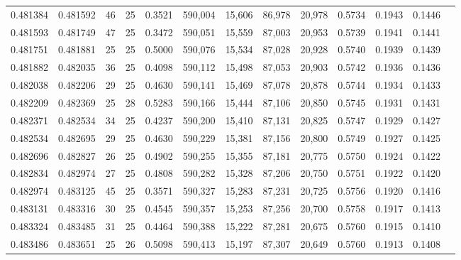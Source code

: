\begin{tabular}{rrrrrrrrrrrrr}
0.481384 & 0.481592 &    46 &  25 &                                     0.3521 & 590,004 &  15,606 &  86,978 &  20,978 & 0.5734 & 0.1943 & 0.1446 \\
0.481593 & 0.481749 &    47 &  25 &                                     0.3472 & 590,051 &  15,559 &  87,003 &  20,953 & 0.5739 & 0.1941 & 0.1441 \\
0.481751 & 0.481881 &    25 &  25 &                                     0.5000 & 590,076 &  15,534 &  87,028 &  20,928 & 0.5740 & 0.1939 & 0.1439 \\
0.481882 & 0.482035 &    36 &  25 &                                     0.4098 & 590,112 &  15,498 &  87,053 &  20,903 & 0.5742 & 0.1936 & 0.1436 \\
0.482038 & 0.482206 &    29 &  25 &                                     0.4630 & 590,141 &  15,469 &  87,078 &  20,878 & 0.5744 & 0.1934 & 0.1433 \\
0.482209 & 0.482369 &    25 &  28 &                                     0.5283 & 590,166 &  15,444 &  87,106 &  20,850 & 0.5745 & 0.1931 & 0.1431 \\
0.482371 & 0.482534 &    34 &  25 &                                     0.4237 & 590,200 &  15,410 &  87,131 &  20,825 & 0.5747 & 0.1929 & 0.1427 \\
0.482534 & 0.482695 &    29 &  25 &                                     0.4630 & 590,229 &  15,381 &  87,156 &  20,800 & 0.5749 & 0.1927 & 0.1425 \\
0.482696 & 0.482827 &    26 &  25 &                                     0.4902 & 590,255 &  15,355 &  87,181 &  20,775 & 0.5750 & 0.1924 & 0.1422 \\
0.482834 & 0.482974 &    27 &  25 &                                     0.4808 & 590,282 &  15,328 &  87,206 &  20,750 & 0.5751 & 0.1922 & 0.1420 \\
0.482974 & 0.483125 &    45 &  25 &                                     0.3571 & 590,327 &  15,283 &  87,231 &  20,725 & 0.5756 & 0.1920 & 0.1416 \\
0.483131 & 0.483316 &    30 &  25 &                                     0.4545 & 590,357 &  15,253 &  87,256 &  20,700 & 0.5758 & 0.1917 & 0.1413 \\
0.483324 & 0.483485 &    31 &  25 &                                     0.4464 & 590,388 &  15,222 &  87,281 &  20,675 & 0.5760 & 0.1915 & 0.1410 \\
0.483486 & 0.483651 &    25 &  26 &                                     0.5098 & 590,413 &  15,197 &  87,307 &  20,649 & 0.5760 & 0.1913 & 0.1408 \\

\end{tabular}
